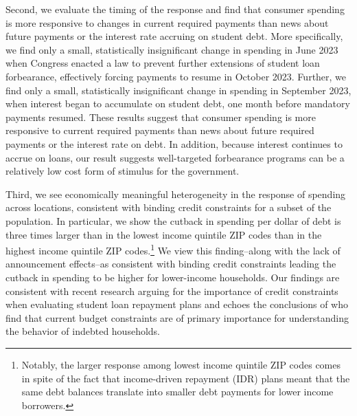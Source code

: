 \documentclass[12pt]{article}
\begin{document}
Second, we evaluate the timing of the response and find that consumer spending is more responsive to changes in current required payments than news about future payments or the interest rate accruing on student debt. 
More specifically, we find only a small, statistically insignificant change in spending in June 2023 when Congress enacted a law to prevent further extensions of student loan forbearance, effectively forcing payments to resume in October 2023. Further, we find only a small, statistically insignificant change in spending in September 2023, when interest began to accumulate on student debt, one month before mandatory payments resumed. These results suggest that consumer spending is more responsive to current required payments than news about future required payments or the interest rate on debt. In addition, because interest continues to accrue on loans, our result suggests well-targeted forbearance programs can be a relatively low cost form of stimulus for the government.

Third, we see economically meaningful heterogeneity in the response of spending across locations, consistent with binding credit constraints for a subset of the population. In particular, we show the cutback in spending per dollar of debt is three times larger than in the lowest income quintile ZIP codes than in the highest income quintile ZIP codes.\footnote{Notably, the larger response among lowest income quintile ZIP codes comes in spite of the fact that income-driven repayment (IDR) plans meant that the same debt balances translate into smaller debt payments for lower income borrowers.}
We view this finding--along with the lack of announcement effects--as consistent with binding credit constraints leading the cutback in spending to be higher for lower-income households. 
Our findings are consistent with recent research arguing for the importance of credit constraints when evaluating student loan repayment plans \citep{boutros_borrow_2022} and echoes the conclusions of \cite{ganong2020liquidity} who find that current budget constraints are of primary importance for understanding the behavior of indebted households.
 
\end{document}
